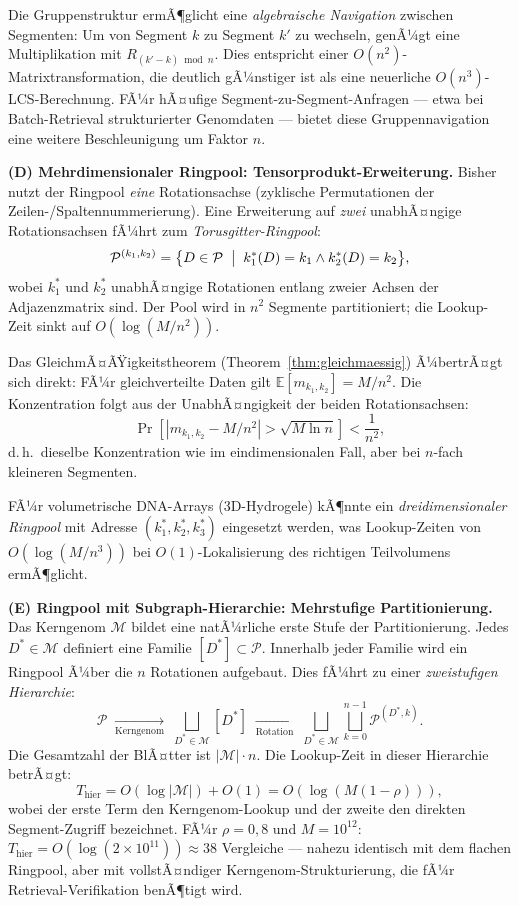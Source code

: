 ﻿\documentclass[a4paper,12pt]{article}
\theoremstyle{definition}
\theoremstyle{plain}
\begin{document}
Die Gruppenstruktur ermÃ¶glicht eine \emph{algebraische Navigation}
zwischen Segmenten: Um von Segment $k$ zu Segment $k'$ zu wechseln,
genÃ¼gt eine Multiplikation mit $R_{(k'-k) \bmod n}$.  Dies entspricht
einer $O(n^2)$-Matrixtransformation, die deutlich gÃ¼nstiger ist als eine
neuerliche $O(n^3)$-LCS-Berechnung.  FÃ¼r hÃ¤ufige Segment-zu-Segment-Anfragen
--- etwa bei Batch-Retrieval strukturierter Genomdaten --- bietet diese
Gruppennavigation eine weitere Beschleunigung um Faktor $n$.

\textbf{(D) Mehrdimensionaler Ringpool: Tensorprodukt-Erweiterung.}
Bisher nutzt der Ringpool \emph{eine} Rotationsachse (zyklische
Permutationen der Zeilen-/Spaltennummerierung).  Eine Erweiterung auf
\emph{zwei} unabhÃ¤ngige Rotationsachsen fÃ¼hrt zum \emph{Torusgitter-Ringpool}:
\[
  \mathcal{P}^{(k_1, k_2)} = \bigl\{D \in \mathcal{P} \;\bigm|\;
    k_1^*(D) = k_1 \wedge k_2^*(D) = k_2\bigr\},
\]
wobei $k_1^*$ und $k_2^*$ unabhÃ¤ngige Rotationen entlang zweier Achsen
der Adjazenzmatrix sind.  Der Pool wird in $n^2$ Segmente partitioniert;
die Lookup-Zeit sinkt auf $O(\log(M/n^2))$.

Das GleichmÃ¤ÃŸigkeitstheorem (Theorem~\ref{thm:gleichmaessig}) Ã¼bertrÃ¤gt
sich direkt: FÃ¼r gleichverteilte Daten gilt
$\mathbb{E}[m_{k_1,k_2}] = M/n^2$.  Die Konzentration folgt aus
der UnabhÃ¤ngigkeit der beiden Rotationsachsen:
\[
  \Pr\!\left[|m_{k_1,k_2} - M/n^2| > \sqrt{M \ln n}\right]
  < \frac{1}{n^2},
\]
d.\,h.\ dieselbe Konzentration wie im eindimensionalen Fall, aber bei
$n$-fach kleineren Segmenten.

FÃ¼r volumetrische DNA-Arrays (3D-Hydrogele) kÃ¶nnte ein
\emph{dreidimensionaler Ringpool} mit Adresse $(k_1^*, k_2^*, k_3^*)$
eingesetzt werden, was Lookup-Zeiten von $O(\log(M/n^3))$ bei
$O(1)$-Lokalisierung des richtigen Teilvolumens ermÃ¶glicht.

\textbf{(E) Ringpool mit Subgraph-Hierarchie: Mehrstufige Partitionierung.}
Das Kerngenom $\mathcal{M}$ bildet eine natÃ¼rliche erste Stufe der
Partitionierung.  Jedes $D^* \in \mathcal{M}$ definiert eine Familie
$[D^*] \subset \mathcal{P}$.  Innerhalb jeder Familie wird ein
Ringpool Ã¼ber die $n$ Rotationen aufgebaut.  Dies fÃ¼hrt zu einer
\emph{zweistufigen Hierarchie}:
\[
  \mathcal{P}
  \;\underset{\text{Kerngenom}}{\longrightarrow}\;
  \bigsqcup_{D^* \in \mathcal{M}} [D^*]
  \;\underset{\text{Rotation}}{\longrightarrow}\;
  \bigsqcup_{D^* \in \mathcal{M}} \bigsqcup_{k=0}^{n-1} \mathcal{P}^{(D^*, k)}.
\]
Die Gesamtzahl der BlÃ¤tter ist $|\mathcal{M}| \cdot n$.  Die Lookup-Zeit
in dieser Hierarchie betrÃ¤gt:
\[
  T_{\mathrm{hier}} = O(\log|\mathcal{M}|) + O(1)
  = O(\log(M(1-\rho))),
\]
wobei der erste Term den Kerngenom-Lookup und der zweite den direkten
Segment-Zugriff bezeichnet.  FÃ¼r $\rho = 0{,}8$ und $M = 10^{12}$:
$T_{\mathrm{hier}} = O(\log(2 \times 10^{11})) \approx 38$ Vergleiche
--- nahezu identisch mit dem flachen Ringpool, aber mit vollstÃ¤ndiger
Kerngenom-Strukturierung, die fÃ¼r Retrieval-Verifikation benÃ¶tigt wird.
\end{document}
